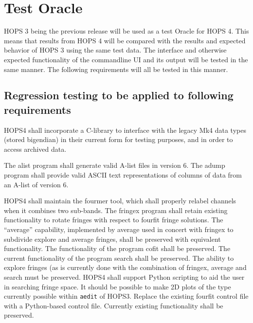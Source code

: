 %
%
\section{Test Oracle}
\label{sec:oracle}
HOPS 3 being the previous release will be used as a test Oracle for HOPS 4. This means that
results from HOPS 4 will be compared with the results and expected behavior of HOPS 3 using
the same test data. The interface and otherwise expected functionality of the commandline UI
and its output will be tested in the same manner. The following requirements will all be tested
in this manner.


\subsection{Regression testing to be applied to following requirements}
\label{sec:oraclereqs}

\begin{description}
 HOPS4 shall incorporate a C-library to interface with the legacy
  \acs{Mk4} data types (stored \acs{bigendian}) in their current form for
  testing purposes, and in order to access archived data.

 The \acs{alist} program shall generate valid \acs{A-list} files in
  version 6.
 The \acs{adump} program shall provide valid ASCII text representations
  of columns of data from an \acs{A-list} of version 6.

 HOPS4 shall maintain the \acs{fourmer} tool, which shall properly
  relabel channels when it combines two sub-bands.
 The \acs{fringex} program shall retain existing functionality to rotate
  fringes with respect to fourfit fringe solutions.
 The ``average'' capability, implemented by \acs{average} used in
  concert with \acs{fringex} to subdivide explore and average fringes, shall be
  preserved with equivalent functionality.
 The functionality of the program \acs{cofit} shall be preserved.
 The current functionality of the program \acs{search} shall be
  preserved.
 The ability to explore fringes (as is currently done with the
  combination of \acs{fringex}, \acs{average} and search must be preserved.
  HOPS4 shall support \acs{Python} scripting to aid the user in searching
  fringe space.
 It should be possible to make 2D plots of the type currently possible
  within \texttt{\acs{aedit}} of HOPS3.
 Replace the existing \acs{fourfit} control file with a
  \acs{Python}-based control file. Currently existing functionality shall be
  preserved.
\end{description}

%
%
